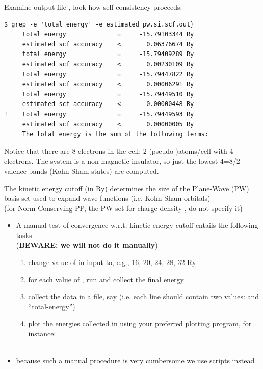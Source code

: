 \documentclass[landscape]{foils}
\begin{document}
Examine output file , look how self-consistency proceeds:
{\codecolor
\begin{verbatim}
$ grep -e 'total energy' -e estimated pw.si.scf.out}
     total energy              =     -15.79103344 Ry
     estimated scf accuracy    <       0.06376674 Ry
     total energy              =     -15.79409289 Ry
     estimated scf accuracy    <       0.00230109 Ry
     total energy              =     -15.79447822 Ry
     estimated scf accuracy    <       0.00006291 Ry
     total energy              =     -15.79449510 Ry
     estimated scf accuracy    <       0.00000448 Ry
!    total energy              =     -15.79449593 Ry
     estimated scf accuracy    <       0.00000005 Ry
     The total energy is the sum of the following terms:
\end{verbatim}
}
Notice that there are 8 electrons in the cell: 2 (pseudo-)atoms/cell
with 4 electrons. The system is a non-magnetic insulator, so just the 
lowest 4=8/2 valence bands (Kohn-Sham states) are computed.

%
The kinetic energy cutoff  (in Ry) determines the size
of the Plane-Wave (PW) basis set used to expand wave-functions (i.e. 
Kohn-Sham orbitals) \\
{\small (for Norm-Conserving PP, the PW set for charge density
  , do not specify it)}

\begin{itemize}
\item A manual test of convergence w.r.t. kinetic energy cutoff entails the
following tasks\\({\bf BEWARE: we will not do it manually})
\begin{enumerate}
\item change value of  in  
  input to, e.g., 16, 20, 24, 28, 32 Ry
\item for each value of , run  and collect the final energy
\item collect the data in a file, say 
  (i.e. each line should contain two values:  and ``total-energy'')
\item plot the energies collected in  using your preferred
  plotting program, for instance:\\[0.5em]
  \\
\end{enumerate}
\item because such a manual procedure is very cumbersome we use
  scripts instead
\end{itemize}
\end{document}
